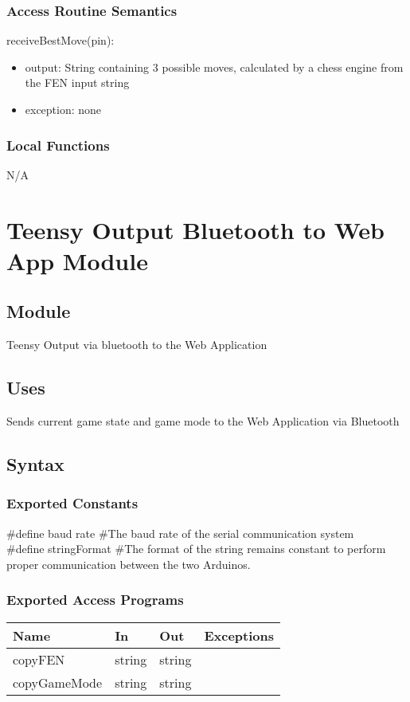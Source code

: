 \documentclass[12pt, titlepage]{article}
\begin{document}
    \subsubsection{Access Routine Semantics}
        \noindent receiveBestMove(pin):
        \begin{itemize}
            \item output: String containing 3 possible moves, calculated by a chess engine from the FEN input string
            \item exception: none
        \end{itemize}

    \subsubsection{Local Functions}
    N/A

\newpage

\section{Teensy Output Bluetooth to Web App Module} \label{TeensyToWaTx}
    \subsection{Module}
    Teensy Output via bluetooth to the Web Application

    \subsection{Uses}
    Sends current game state and game mode to the Web Application via Bluetooth

    \subsection{Syntax}
    \subsubsection{Exported Constants}
    \#define baud rate \#The baud rate of the serial communication system\\
    \#define stringFormat \#The format of the string remains constant to perform proper 
    communication between the two Arduinos.
    
    \subsubsection{Exported Access Programs}
        \begin{center}
        \begin{tabular}{p{4cm} p{3cm} p{3cm} p{2.5cm}}
        \hline
        \textbf{Name} & \textbf{In} & \textbf{Out} & \textbf{Exceptions} \\
        \hline
        copyFEN & string & string & \\
        copyGameMode & string & string & \\
        \hline
        \end{tabular}
        \end{center}
\end{document}
